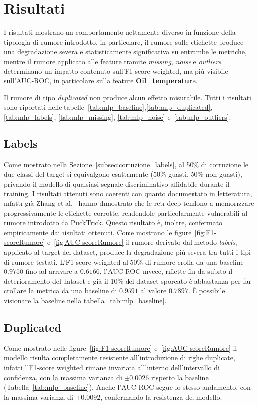 \documentclass[../main.tex]{subfiles}
\begin{document}
\section{Risultati}
I risultati mostrano un comportamento nettamente diverso in funzione della tipologia di rumore introdotto, in particolare, il rumore sulle etichette produce una degradazione severa e statisticamente significativa su entrambe le metriche, mentre il rumore applicato alle feature tramite \textit{missing}, \textit{noise} e \textit{outliers} determinano un impatto contenuto sull'F1-score weighted, ma più visibile sull'AUC-ROC, in particolare sulla feature \textbf{Oil\_temperature}. 

Il rumore di tipo \textit{duplicated} non produce alcun effetto misurabile. 
Tutti i risultati sono riportati nelle tabelle~\ref{tab:mlp_baseline},\ref{tab:mlp_duplicated}, \ref{tab:mlp_labels}, \ref{tab:mlp_missing}, \ref{tab:mlp_noise} e~\ref{tab:mlp_outliers}.

\subsection{Labels} 
\label{subsec:mlp_labels}
Come mostrato nella Sezione~\ref{subsec:corruzione_labels}, al 50\% di corruzione le due classi del target si equivalgono esattamente (50\% guasti, 50\% non guasti), privando il modello di qualsiasi segnale discriminativo affidabile durante il training. I risultati ottenuti sono coerenti con quanto documentato in letteratura, infatti già Zhang et al.~\cite{zhang2017understandingdeeplearningrequires} hanno dimostrato che le reti deep tendono a memorizzare progressivamente le etichette corrotte, rendendole particolarmente vulnerabili al rumore introdotto da PuckTrick. Questo risultato è, inoltre, confermato empiricamente dai risultati ottenuti. Come mostrano le figure~\ref{fig:F1-scoreRumore} e~\ref{fig:AUC-scoreRumore} il rumore derivato dal metodo \textit{labels}, applicato al target del dataset, produce la degradazione più severa tra tutti i tipi di rumore testati. L'F1-score weighted al 50\% di rumore crolla da una baseline $0.9750$  fino ad arrivare a $0.6166$, l'AUC-ROC invece, riflette fin da subito il deterioramento del dataset e già il 10\% del dataset sporcato è abbastanza per far crollare la metrica da una baseline di $0.9591$ al valore $0.7897$. È possibile visionare la baseline nella tabella~\ref{tab:mlp_baseline}.

\subsection{Duplicated}
\label{subsec:mlp_duplicated}
Come mostrato nelle figure~\ref{fig:F1-scoreRumore} e~\ref{fig:AUC-scoreRumore} il modello risulta completamente resistente all'introduzione di righe duplicate, infatti l'F1-score weighted rimane invariata all'interno dell'intervallo di confidenza, con la massima varianza di $\pm 0.0026$ rispetto la baseline (Tabella~\ref{tab:mlp_baseline}). Anche l'AUC-ROC segue lo stesso andamento, con la massima varianza di $\pm 0.0092$, confermando la resistenza del modello.
\end{document}
